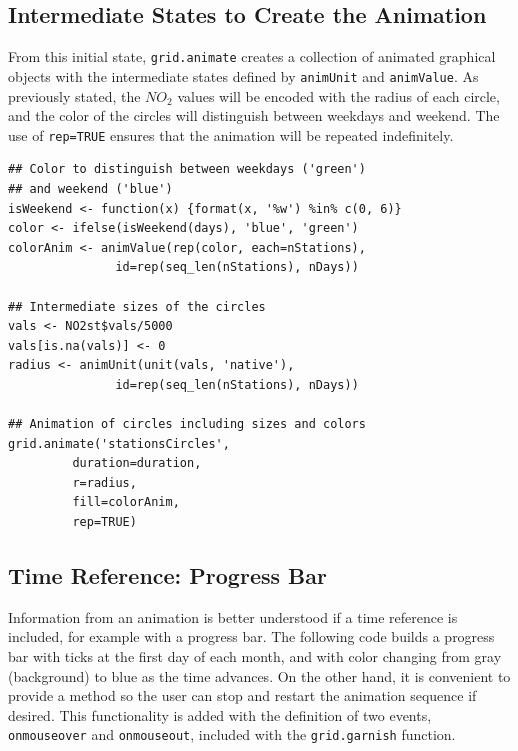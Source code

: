 \documentclass[smallroyalvopaper]{memoir}
\begin{document}
\subsection{Intermediate States to Create the Animation}
\label{sec-4-2}
From this initial state, \texttt{grid.animate} creates a collection of
animated graphical objects with the intermediate states defined by
\texttt{animUnit} and \texttt{animValue}.  As previously stated, the $NO_2$ values
will be encoded with the radius of each circle, and the color of the
circles will distinguish between weekdays and weekend.  The use of
\texttt{rep=TRUE} ensures that the animation will be repeated indefinitely.


\lstset{language=R,numbers=none}
\begin{lstlisting}
## Color to distinguish between weekdays ('green')
## and weekend ('blue')
isWeekend <- function(x) {format(x, '%w') %in% c(0, 6)}
color <- ifelse(isWeekend(days), 'blue', 'green')
colorAnim <- animValue(rep(color, each=nStations),
		       id=rep(seq_len(nStations), nDays))

## Intermediate sizes of the circles
vals <- NO2st$vals/5000
vals[is.na(vals)] <- 0
radius <- animUnit(unit(vals, 'native'),
		       id=rep(seq_len(nStations), nDays))                     

## Animation of circles including sizes and colors
grid.animate('stationsCircles',
	     duration=duration,
	     r=radius,
	     fill=colorAnim,
	     rep=TRUE)
\end{lstlisting}
\subsection{Time Reference: Progress Bar}
\label{sec-4-3}
Information from an animation is better understood if a time
reference is included, for example with a progress bar.  The following
code builds a progress bar with ticks at the first day of each
month, and with color changing from gray (background) to blue as
the time advances.  On the other hand, it is convenient to provide
a method so the user can stop and restart the animation sequence
if desired.  This functionality is added with the definition of
two events, \texttt{onmouseover} and \texttt{onmouseout}, included with the
\texttt{grid.garnish} function.

\end{document}
